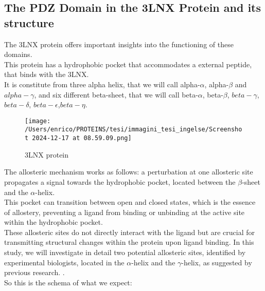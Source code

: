\documentclass[English, Lau, oneside]{sapthesis}
\begin{document}
\subsection{The PDZ Domain in the 3LNX Protein and its structure}

\noindent The 3LNX protein offers important insights into the functioning of these domains.\\
This protein has a hydrophobic pocket that accommodates a external peptide, that binds with the 3LNX.\\
It is constitute from three alpha helix, that we will call alpha-$\alpha$, alpha-$\beta$ and $alpha-\gamma$, and six different beta-sheet, that we will call beta-$\alpha$, beta-$\beta$, $beta-\gamma$,$beta-\delta$, $beta-\epsilon$,$beta-\eta$. \\
\begin{figure}[H]
    \centering
    \texttt{[image: /Users/enrico/PROTEINS/tesi/immagini\_tesi\_ingelse/Screenshot 2024-12-17 at 08.59.09.png]}
    \caption{3LNX protein}
\end{figure}
The allosteric mechanism works as follows: a perturbation at one allosteric site propagates a signal towards the hydrophobic pocket, located between the $\beta$-sheet and the $\alpha$-helix. \\
This pocket can transition between open and closed states, which is the essence of allostery, preventing a ligand from binding or unbinding at the active site within the hydrophobic pocket. \\
These allosteric sites do not directly interact with the ligand but are crucial for transmitting structural changes within the protein upon ligand binding. In this study, we will investigate in detail two potential allosteric sites, identified by experimental biologists, located in the $\alpha$-helix and the $\gamma$-helix, as suggested by previous research. \cite{ref15}.\\
So this is the schema of what we expect:
\end{document}
